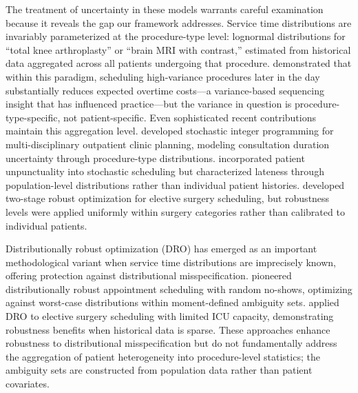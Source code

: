 \documentclass[11pt,a4paper]{article}
\begin{document}
The treatment of uncertainty in these models warrants careful examination because it reveals the gap our framework addresses. Service time distributions are invariably parameterized at the procedure-type level: lognormal distributions for ``total knee arthroplasty'' or ``brain MRI with contrast,'' estimated from historical data aggregated across all patients undergoing that procedure. \citet{denton2007optimization} demonstrated that within this paradigm, scheduling high-variance procedures later in the day substantially reduces expected overtime costs---a variance-based sequencing insight that has influenced practice---but the variance in question is procedure-type-specific, not patient-specific. Even sophisticated recent contributions maintain this aggregation level. \citet{leeftink2019stochastic} developed stochastic integer programming for multi-disciplinary outpatient clinic planning, modeling consultation duration uncertainty through procedure-type distributions. \citet{jiang2019stochastic} incorporated patient unpunctuality into stochastic scheduling but characterized lateness through population-level distributions rather than individual patient histories. \citet{neyshabouri2017two} developed two-stage robust optimization for elective surgery scheduling, but robustness levels were applied uniformly within surgery categories rather than calibrated to individual patients.

Distributionally robust optimization (DRO) has emerged as an important methodological variant when service time distributions are imprecisely known, offering protection against distributional misspecification. \citet{jiang2017integer} pioneered distributionally robust appointment scheduling with random no-shows, optimizing against worst-case distributions within moment-defined ambiguity sets. \citet{shehadeh2021distributionally} applied DRO to elective surgery scheduling with limited ICU capacity, demonstrating robustness benefits when historical data is sparse. These approaches enhance robustness to distributional misspecification but do not fundamentally address the aggregation of patient heterogeneity into procedure-level statistics; the ambiguity sets are constructed from population data rather than patient covariates.
\end{document}
